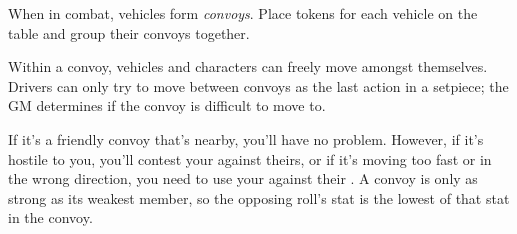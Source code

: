 
When in combat, vehicles form \emph{convoys}. Place tokens for each vehicle on the table and group their convoys together.

Within a convoy, vehicles and characters can freely move amongst themselves. Drivers can only try to move between convoys as the last action in a setpiece; the GM determines if the convoy is difficult to move to.

If it's a friendly convoy that's nearby, you'll have no problem. However, if it's hostile to you, you'll contest your  against theirs, or if it's moving too fast or in the wrong direction, you need to use your  against their . A convoy is only as strong as its weakest member, so the opposing roll's stat is the lowest of that stat in the convoy.
